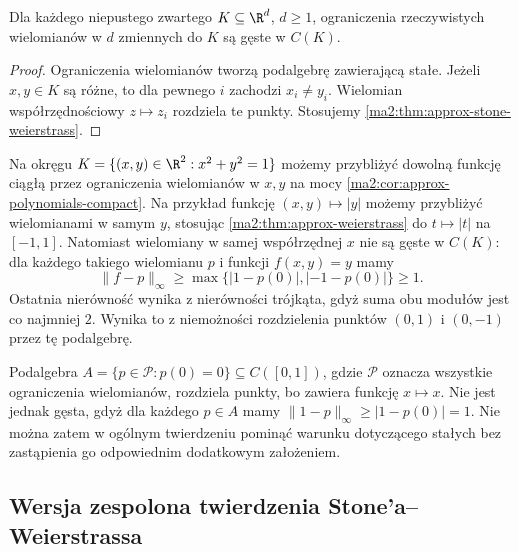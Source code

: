 \begin{wniosek}
\label{ma2:cor:approx-polynomials-compact}
Dla każdego niepustego zwartego $K\subseteq\R^d$,
$d\ge1$, ograniczenia rzeczywistych wielomianów
w $d$ zmiennych do $K$ są gęste w $C(K)$.
\end{wniosek}
\begin{proof}
Ograniczenia wielomianów tworzą podalgebrę
zawierającą stałe. Jeżeli $x,y\in K$
są różne, to dla pewnego $i$ zachodzi
$x_i\ne y_i$. Wielomian współrzędnościowy
$z\mapsto z_i$ rozdziela te punkty.
Stosujemy \ref{ma2:thm:approx-stone-weierstrass}.
\end{proof}

\begin{przyklad}
\label{ma2:ex:approx-circle}
Na okręgu $K=\{(x,y)\in\R^2:x^2+y^2=1\}$
możemy przybliżyć dowolną funkcję ciągłą
przez ograniczenia wielomianów w $x,y$
na mocy \ref{ma2:cor:approx-polynomials-compact}.
Na przykład funkcję $(x,y)\mapsto|y|$
możemy przybliżyć wielomianami w samym $y$,
stosując \ref{ma2:thm:approx-weierstrass}
do $t\mapsto|t|$ na $[-1,1]$.
Natomiast wielomiany w samej współrzędnej $x$
nie są gęste w $C(K)$: dla każdego takiego
wielomianu $p$ i funkcji $f(x,y)=y$
mamy
\[
 \|f-p\|_\infty\ge
 \max\{|1-p(0)|,|-1-p(0)|\}\ge1.
\]
Ostatnia nierówność wynika z nierówności
trójkąta, gdyż suma obu modułów jest
co najmniej $2$.
Wynika to z niemożności rozdzielenia
punktów $(0,1)$ i $(0,-1)$ przez tę podalgebrę.
\end{przyklad}

\begin{przyklad}
\label{ma2:ex:approx-no-constants}
Podalgebra
$A=\{p\in\mathcal P:p(0)=0\}\subseteq C([0,1])$,
gdzie $\mathcal P$ oznacza wszystkie ograniczenia
wielomianów, rozdziela punkty, bo zawiera
funkcję $x\mapsto x$.
Nie jest jednak gęsta, gdyż dla każdego $p\in A$
mamy $\|1-p\|_\infty\ge |1-p(0)|=1$.
Nie można zatem w ogólnym twierdzeniu
pominąć warunku dotyczącego stałych bez
zastąpienia go odpowiednim dodatkowym założeniem.
\end{przyklad}


\subsection{Wersja zespolona twierdzenia Stone'a--Weierstrassa}

